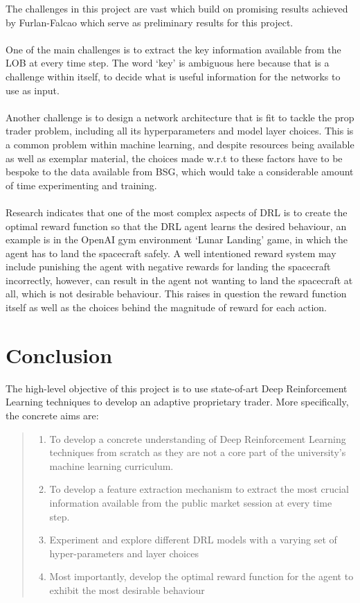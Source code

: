 \documentclass[ %
                    author={Ashwinder Khurana},
                supervisor={Prof Dave Cliff},
                    degree={MEng},
                     title={The Deeply Reinforced Trader},
                  subtitle={},
                      type={enterprise},
                      year={2020} ]{dissertation}
\begin{document}
The challenges in this project are vast which build on promising results achieved by Furlan-Falcao which serve as preliminary results for this project. 
\\
\\
One of the main challenges is to extract the key information available from the LOB at every time step. The word \enquote*{key} is ambiguous here because that is a challenge within itself, to decide what is useful information for the networks to use as input. 
\\
\\
Another challenge is to design a network architecture that is fit to tackle the prop trader problem, including all its hyperparameters and model layer choices. This is a common problem within machine learning, and despite resources being available as well as exemplar material, the choices made w.r.t to these factors have to be bespoke to the data available from BSG, which would take a considerable amount of time experimenting and training. 
\\
\\
Research indicates that one of the most complex aspects of DRL is to create the optimal reward function so that the DRL agent learns the desired behaviour, an example is in the OpenAI gym environment \enquote*{Lunar Landing} game, in which the agent has to land the spacecraft safely. A well intentioned reward system may include punishing the agent with negative rewards for landing the spacecraft incorrectly, however, can result in the agent not wanting to land the spacecraft at all, which is not desirable behaviour. This raises in question the reward function itself as well as the choices behind the magnitude of reward for each action. 


\vspace{0.5cm}
\section{Conclusion}
\vspace{0.5cm} 

The high-level objective of this project is to use state-of-art Deep Reinforcement Learning techniques to develop an adaptive proprietary trader.  
More specifically, the concrete aims are:


\begin{quote}
\begin{enumerate}
\item To develop a concrete understanding of Deep Reinforcement Learning techniques from scratch as they are not a core part of the university's machine learning curriculum.
\item To develop a feature extraction mechanism to extract the most crucial information available from the public market session at every time step.
\item Experiment and explore different DRL models with a varying set of hyper-parameters and layer choices
\item Most importantly, develop the optimal reward function for the agent to exhibit the most desirable behaviour 
\end{enumerate}
\end{quote}
\end{document}
